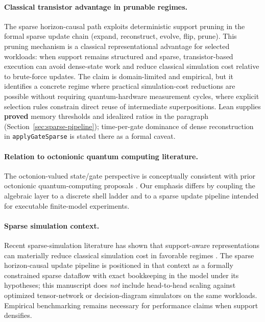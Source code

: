 \documentclass[11pt,a4paper]{article}
\newcommand{\lean}[1]{\path{#1}}
\theoremstyle{remark}
\begin{document}
\paragraph{Classical transistor advantage in prunable regimes.}
The sparse horizon-causal path exploits deterministic support pruning in the formal sparse update chain (expand, reconstruct, evolve, flip, prune). This pruning mechanism is a classical representational advantage for selected workloads: when support remains structured and sparse, transistor-based execution can avoid dense-state work and reduce classical simulation cost relative to brute-force updates. The claim is domain-limited and empirical, but it identifies a concrete regime where practical simulation-cost reductions are possible without requiring quantum-hardware measurement cycles, where explicit selection rules constrain direct reuse of intermediate superpositions.
Lean supplies \textbf{proved} memory thresholds and idealized ratios in the \lean{SparseSimulationDensityCrossover} paragraph (Section~\ref{sec:sparse-pipeline}); time-per-gate dominance of dense reconstruction in \texttt{applyGateSparse} is stated there as a formal caveat.

\paragraph{Relation to octonionic quantum computing literature.}
The octonion-valued state/gate perspective is conceptually consistent with prior octonionic quantum-computing proposals \cite{freedman2019,baez2002octonions,dixon2020octonionic}. Our emphasis differs by coupling the algebraic layer to a discrete shell ladder and to a sparse update pipeline intended for executable finite-model experiments.

\paragraph{Sparse simulation context.}
Recent sparse-simulation literature has shown that support-aware representations can materially reduce classical simulation cost in favorable regimes \cite{sun2025,sparsesim2024}. The sparse horizon-causal update pipeline is positioned in that context as a formally constrained sparse dataflow with exact bookkeeping in the model under its hypotheses; this manuscript does \emph{not} include head-to-head scaling against optimized tensor-network or decision-diagram simulators on the same workloads. Empirical benchmarking remains necessary for performance claims when support densifies.
\end{document}
